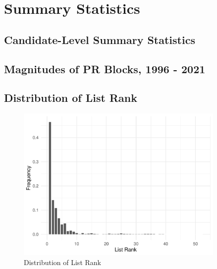 \documentclass[a4paper, 11pt]{article}
\begin{document}

\newpage




\newpage

\appendix

\setcounter{table}{0}
\setcounter{figure}{0}
\renewcommand{\thetable}{A\arabic{table}}
\renewcommand{\thefigure}{A\arabic{figure}}

\section{Summary Statistics}

\subsection{Candidate-Level Summary Statistics}



\newpage

\subsection{Magnitudes of PR Blocks, 1996 - 2021}



\newpage

\subsection{Distribution of List Rank}

\begin{figure}[!htbp]
	\includegraphics[width = 0.9\textwidth]{../figure/paper/pr_rank_distribution.pdf}
	\caption{Distribution of List Rank}
	\label{fig:distRank}
\end{figure}
\end{document}

